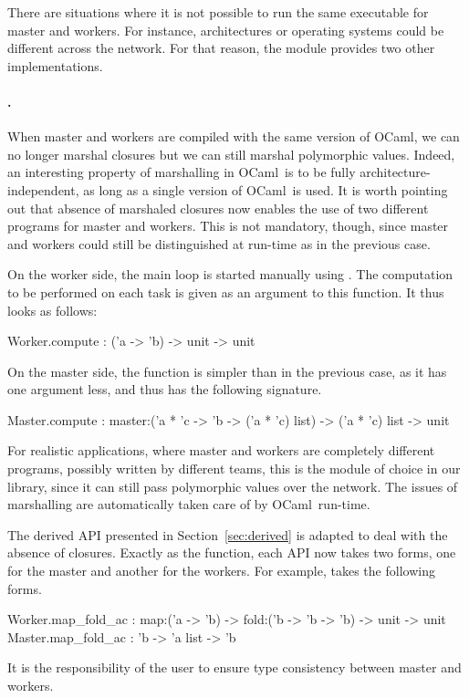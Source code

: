 \documentclass[a4paper,12pt]{article}
\newcommand{\Ocaml}{OCaml}
\begin{document}
\bigskip
There are situations where it is not possible
to run the same executable for master and workers.
For instance, architectures or operating systems could be different
across the network.
For that reason, the  module provides two other
implementations. 

\paragraph{.} When master and workers are compiled with the
same version of \Ocaml, we can no longer marshal closures but we can
still marshal polymorphic values. Indeed, an interesting property of
marshalling in \Ocaml\ is to be fully architecture-independent, as long
as a single version of \Ocaml\ is used. It is worth pointing out that
absence of marshaled closures
now enables the use of two different programs for master and workers. This
is not mandatory, though, since master and workers could still be
distinguished at run-time as in the previous case. 

On the worker side, the main loop is started manually using
. The computation to be performed on each task is
given as an argument to this function. It thus looks as follows:
\begin{ocaml}
  Worker.compute : ('a -> 'b) -> unit -> unit
\end{ocaml}
On the master side, the  function is simpler than in the
previous case, as it has one argument less, and thus has the following
signature. 
\begin{ocaml}
  Master.compute : master:('a * 'c -> 'b -> ('a * 'c) list) -> ('a * 'c) list -> unit 
\end{ocaml}
For realistic applications, where master and workers are completely
different programs, possibly written by different teams, this is the
module of choice in our library, since it can still pass polymorphic
values over the network. The issues of marshalling are automatically
taken care of by \Ocaml\ run-time.

The derived API presented in Section~\ref{sec:derived} is adapted to
deal with the absence of closures. Exactly as the 
function, each API now takes two forms, one for the master and another
for the workers. For example,  takes the following
forms.
\begin{ocaml}
  Worker.map_fold_ac : map:('a -> 'b) -> fold:('b -> 'b -> 'b) -> unit -> unit
  Master.map_fold_ac : 'b -> 'a list -> 'b
\end{ocaml}
It is the responsibility of the user to ensure type consistency between
master and workers.
\end{document}
